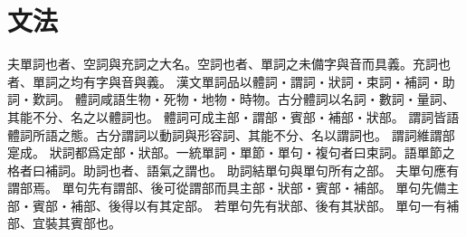 \chapter*{文法}
夫單詞也者、空詞與充詞之大名。空詞也者、單詞之未備字與音而具義。充詞也者、單詞之均有字與音與義。
漢文單詞品以體詞・謂詞・狀詞・束詞・補詞・助詞・歎詞。
體詞咸語生物・死物・地物・時物。古分體詞以名詞・數詞・量詞、其能不分、名之以體詞也。
體詞可成主部・謂部・賓部・補部・狀部。
謂詞皆語體詞所語之態。古分謂詞以動詞與形容詞、其能不分、名以謂詞也。
謂詞維謂部寔成。
狀詞都爲定部・狀部。一統單詞・單節・單句・複句者曰束詞。語單節之格者曰補詞。助詞也者、語氣之謂也。
助詞結單句與單句所有之部。
夫單句應有謂部焉。
單句先有謂部、後可從謂部而具主部・狀部・賓部・補部。
單句先備主部・賓部・補部、後得以有其定部。
若單句先有狀部、後有其狀部。
單句一有補部、宜裝其賓部也。
